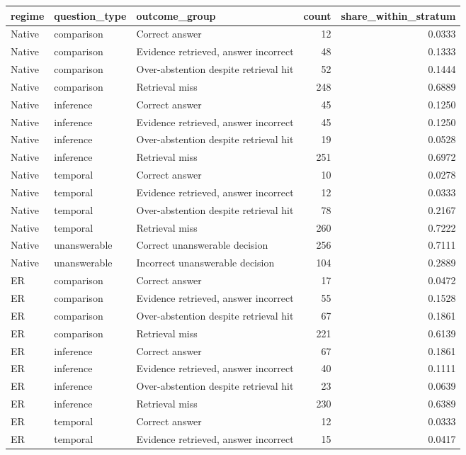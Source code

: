 \begin{tabular}{lllrr}
\toprule
regime & question_type & outcome_group & count & share_within_stratum \\
\midrule
Native & comparison & Correct answer & 12 & 0.0333 \\
Native & comparison & Evidence retrieved, answer incorrect & 48 & 0.1333 \\
Native & comparison & Over-abstention despite retrieval hit & 52 & 0.1444 \\
Native & comparison & Retrieval miss & 248 & 0.6889 \\
Native & inference & Correct answer & 45 & 0.1250 \\
Native & inference & Evidence retrieved, answer incorrect & 45 & 0.1250 \\
Native & inference & Over-abstention despite retrieval hit & 19 & 0.0528 \\
Native & inference & Retrieval miss & 251 & 0.6972 \\
Native & temporal & Correct answer & 10 & 0.0278 \\
Native & temporal & Evidence retrieved, answer incorrect & 12 & 0.0333 \\
Native & temporal & Over-abstention despite retrieval hit & 78 & 0.2167 \\
Native & temporal & Retrieval miss & 260 & 0.7222 \\
Native & unanswerable & Correct unanswerable decision & 256 & 0.7111 \\
Native & unanswerable & Incorrect unanswerable decision & 104 & 0.2889 \\
ER & comparison & Correct answer & 17 & 0.0472 \\
ER & comparison & Evidence retrieved, answer incorrect & 55 & 0.1528 \\
ER & comparison & Over-abstention despite retrieval hit & 67 & 0.1861 \\
ER & comparison & Retrieval miss & 221 & 0.6139 \\
ER & inference & Correct answer & 67 & 0.1861 \\
ER & inference & Evidence retrieved, answer incorrect & 40 & 0.1111 \\
ER & inference & Over-abstention despite retrieval hit & 23 & 0.0639 \\
ER & inference & Retrieval miss & 230 & 0.6389 \\
ER & temporal & Correct answer & 12 & 0.0333 \\
ER & temporal & Evidence retrieved, answer incorrect & 15 & 0.0417 \\

\end{tabular}
